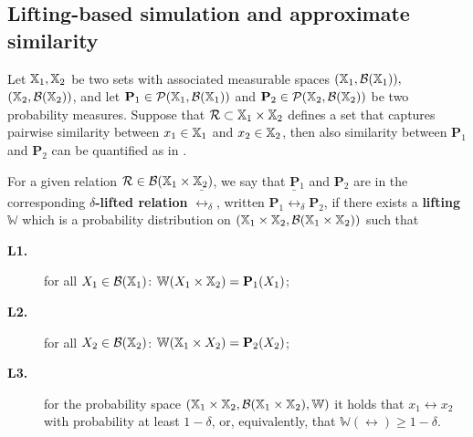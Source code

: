 \documentclass{ifacconf}
\begin{document}


\subsection{Lifting-based simulation and approximate similarity}

Let ${\mathbb{X}}_1,{\mathbb{X}}_2$ be two sets with associated measurable spaces $({\mathbb{X}}_1,\mathcal B({\mathbb{X}}_1)),$ $({\mathbb{X}}_2,\mathcal B({\mathbb{X}}_2))$, and let $\mathbf{P}_1 \in \mathcal{P}({\mathbb{X}}_1,\mathcal B({\mathbb{X}}_1)) $ and $\mathbf{P}_2 \in \mathcal{P}({\mathbb{X}}_2,\mathcal B({\mathbb{X}}_2)) $ be two probability measures. Suppose that $\mathcal{R} \subset {\mathbb{X}}_1 \times {\mathbb{X}}_2$ defines a set that captures pairwise similarity between $x_1 \in {\mathbb{X}}_1$ and $x_2 \in {\mathbb{X}}_2$, then also similarity between $\mathbf{P}_1$ and $\mathbf{P}_2$ can be quantified as in \cite{haesaert2017verification}.

\begin{definition}
\label{def:dellifting}
  For a given relation $\mathcal{R}\in \mathcal B({\mathbb{X}}_1\times {\mathbb{X}}_2)$, we say that  $\mathbf{P}_1$ and $\mathbf{P}_2$ are in the corresponding \textbf{$\delta$-lifted relation} $\bar \rel_\delta$, written $\mathbf{P}_1 \bar \rel_\delta \mathbf{P}_2$, if there exists a \textbf{lifting} $\mathbb{W}$ which is a probability distribution on $({\mathbb{X}}_1\times {\mathbb{X}}_2,\mathcal B({\mathbb{X}}_1\times {\mathbb{X}}_2))$ such that { \setlength{\parskip}{-1pt}\setlength{\parsep}{0pt}
		\begin{description}
			\item[\textbf{L1.}] for all $X_1\in \mathcal{B}({\mathbb{X}}_1)$: $\mathbb W(X_1\times {\mathbb{X}}_2)=\mathbf{P}_1(X_1)$;
			\item [\textbf{L2.}] for all $X_2\in \mathcal{B}({\mathbb{X}}_2)$:  $\mathbb W({\mathbb{X}}_1\times X_2)=\mathbf{P}_2(X_2)$;
			\item[\textbf{L3.}] for the probability space  $({\mathbb{X}}_1\times {\mathbb{X}}_2,\mathcal B({\mathbb{X}}_1\times {\mathbb{X}}_2), \mathbb W)$ it holds that
			$x_1\rel x_2$ with probability at least $1-\delta$, or, equivalently, that $\mathbb{W}\left(\rel\right)\geq1-\delta$.
	\end{description}}
\end{definition}
\end{document}
